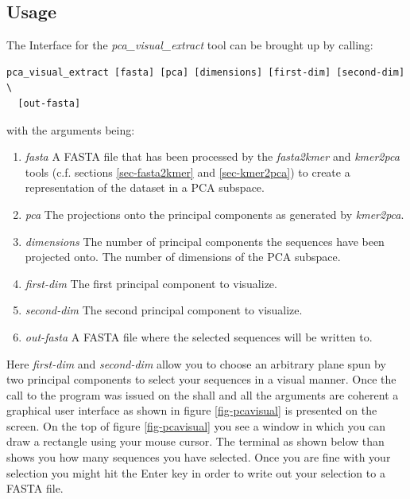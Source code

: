 \subsection{Usage}
The Interface for the \emph{pca\_visual\_extract} tool can be brought
up by calling:
\begin{lstlisting}
pca_visual_extract [fasta] [pca] [dimensions] [first-dim] [second-dim] \
  [out-fasta]
\end{lstlisting}
with the arguments being:
\begin{enumerate}
  \item \emph{fasta} A FASTA file that has been processed by the
    \emph{fasta2kmer} and \emph{kmer2pca} tools (c.f. sections
    \ref{sec-fasta2kmer} and \ref{sec-kmer2pca}) to create a
    representation of the dataset in a PCA subspace.
  \item \emph{pca} The projections onto the principal components as
    generated by \emph{kmer2pca}.
  \item \emph{dimensions} The number of principal components the
    sequences have been projected onto. The number of dimensions of
    the PCA subspace.
  \item \emph{first-dim} The first principal component to visualize.
  \item \emph{second-dim} The second principal component to visualize.
  \item \emph{out-fasta} A FASTA file where the selected sequences
    will be written to. 
\end{enumerate}
Here \emph{first-dim} and \emph{second-dim} allow you to choose an
arbitrary plane spun by two principal components to select your
sequences in a visual manner. Once the call to the program was issued
on the shall and all the arguments are coherent a graphical user
interface as shown in figure \ref{fig-pcavisual} is presented on the
screen. On the top of figure \ref{fig-pcavisual} you see a
window in which you can draw a rectangle using your mouse
cursor. The terminal as shown below than shows you how many
sequences you have selected. Once you are fine with your
selection you might hit the Enter key in order to write out your
selection to a FASTA file.
